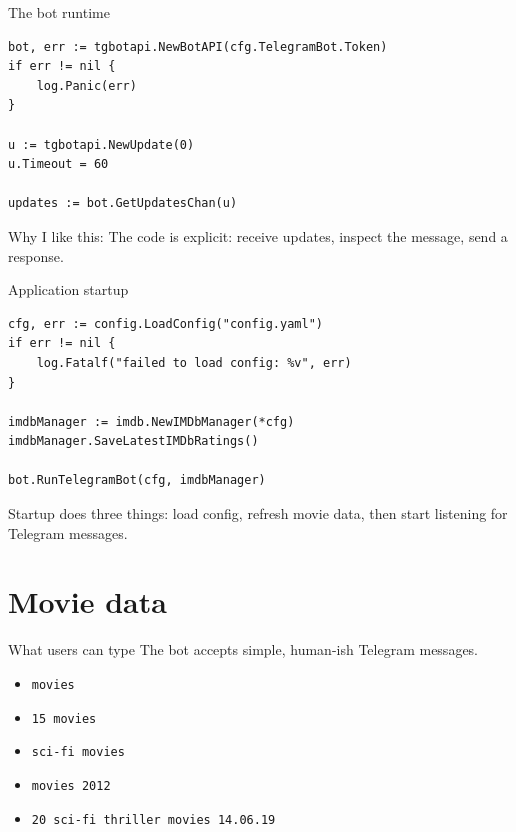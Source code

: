 \documentclass[aspectratio=169,10pt]{beamer}
\begin{document}
\begin{frame}[fragile]{The bot runtime}
\begin{lstlisting}
bot, err := tgbotapi.NewBotAPI(cfg.TelegramBot.Token)
if err != nil {
    log.Panic(err)
}

u := tgbotapi.NewUpdate(0)
u.Timeout = 60

updates := bot.GetUpdatesChan(u)
\end{lstlisting}

\vspace{0.25cm}
\begin{block}{Why I like this: }
\vspace{0.1cm}
The code is explicit: receive updates, inspect the message, send a response.
\end{block}
\end{frame}

\begin{frame}[fragile]{Application startup}
\begin{lstlisting}
cfg, err := config.LoadConfig("config.yaml")
if err != nil {
    log.Fatalf("failed to load config: %v", err)
}

imdbManager := imdb.NewIMDbManager(*cfg)
imdbManager.SaveLatestIMDbRatings()

bot.RunTelegramBot(cfg, imdbManager)
\end{lstlisting}

\vspace{0.25cm}
\normalsize
Startup does three things: load config, refresh movie data, then start listening
for Telegram messages.
\end{frame}

\section{Movie data}

\begin{frame}{What users can type}
  \Large
  The bot accepts simple, human-ish Telegram messages.

  \vspace{0.45cm}
  \normalsize
  \begin{itemize}
    \item \texttt{movies}
    \item \texttt{15 movies}
    \item \texttt{sci-fi movies}
    \item \texttt{movies 2012}
    \item \texttt{20 sci-fi thriller movies 14.06.19}
  \end{itemize}
\end{frame}
\end{document}
